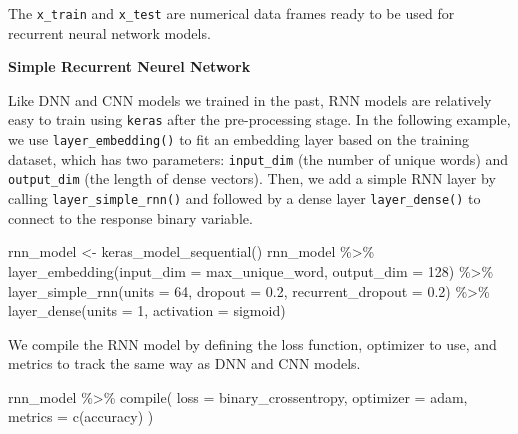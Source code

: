 \documentclass[
  12pt,
]{krantz}
\makeatletter
\newenvironment{Shaded}{\begin{snugshade}}{\end{snugshade}}
\newcommand{\AttributeTok}[1]{\textcolor[rgb]{0.61,0.61,0.61}{#1}}
\newcommand{\DecValTok}[1]{\textcolor[rgb]{0.06,0.06,0.06}{#1}}
\newcommand{\FloatTok}[1]{\textcolor[rgb]{0.06,0.06,0.06}{#1}}
\newcommand{\FunctionTok}[1]{\textcolor[rgb]{0,0,0}{#1}}
\newcommand{\NormalTok}[1]{#1}
\newcommand{\OtherTok}[1]{\textcolor[rgb]{0.37,0.37,0.37}{#1}}
\newcommand{\SpecialCharTok}[1]{\textcolor[rgb]{0,0,0}{#1}}
\newcommand{\StringTok}[1]{\textcolor[rgb]{0.5,0.5,0.5}{#1}}
\newenvironment{kframe}{%
\medskip{}
\setlength{\fboxsep}{.8em}
 \def\at@end@of@kframe{}%
 \ifinner\ifhmode%
  \def\at@end@of@kframe{\end{minipage}}%
  \begin{minipage}{\columnwidth}%
 \fi\fi%
 \def\FrameCommand##1{\hskip\@totalleftmargin \hskip-\fboxsep
 \colorbox{shadecolor}{##1}\hskip-\fboxsep
     \hskip-\linewidth \hskip-\@totalleftmargin \hskip\columnwidth}%
 \MakeFramed {\advance\hsize-\width
   \@totalleftmargin\z@ \linewidth\hsize
   \@setminipage}}%
 {\par\unskip\endMakeFramed%
 \at@end@of@kframe}
\renewenvironment{Shaded}{\begin{kframe}}{\end{kframe}}
\makeatother
\begin{document}
The \texttt{x\_train} and \texttt{x\_test} are numerical data frames ready to be used for recurrent neural network models.

\textbf{Simple Recurrent Neurel Network}

Like DNN and CNN models we trained in the past, RNN models are relatively easy to train using \texttt{keras} after the pre-processing stage. In the following example, we use \texttt{layer\_embedding()} to fit an embedding layer based on the training dataset, which has two parameters: \texttt{input\_dim} (the number of unique words) and \texttt{output\_dim} (the length of dense vectors). Then, we add a simple RNN layer by calling \texttt{layer\_simple\_rnn()} and followed by a dense layer \texttt{layer\_dense()} to connect to the response binary variable.

\begin{Shaded}
\begin{Highlighting}[]
\NormalTok{rnn\_model }\OtherTok{\textless{}{-}} \FunctionTok{keras\_model\_sequential}\NormalTok{()}
\NormalTok{rnn\_model }\SpecialCharTok{\%\textgreater{}\%}
  \FunctionTok{layer\_embedding}\NormalTok{(}\AttributeTok{input\_dim =}\NormalTok{ max\_unique\_word, }\AttributeTok{output\_dim =} \DecValTok{128}\NormalTok{) }\SpecialCharTok{\%\textgreater{}\%} 
  \FunctionTok{layer\_simple\_rnn}\NormalTok{(}\AttributeTok{units =} \DecValTok{64}\NormalTok{, }\AttributeTok{dropout =} \FloatTok{0.2}\NormalTok{, }
                   \AttributeTok{recurrent\_dropout =} \FloatTok{0.2}\NormalTok{) }\SpecialCharTok{\%\textgreater{}\%} 
  \FunctionTok{layer\_dense}\NormalTok{(}\AttributeTok{units =} \DecValTok{1}\NormalTok{, }\AttributeTok{activation =} \StringTok{\textquotesingle{}sigmoid\textquotesingle{}}\NormalTok{)}
\end{Highlighting}
\end{Shaded}

We compile the RNN model by defining the loss function, optimizer to use, and metrics to track the same way as DNN and CNN models.

\begin{Shaded}
\begin{Highlighting}[]
\NormalTok{rnn\_model }\SpecialCharTok{\%\textgreater{}\%} \FunctionTok{compile}\NormalTok{(}
  \AttributeTok{loss =} \StringTok{\textquotesingle{}binary\_crossentropy\textquotesingle{}}\NormalTok{,}
  \AttributeTok{optimizer =} \StringTok{\textquotesingle{}adam\textquotesingle{}}\NormalTok{,}
  \AttributeTok{metrics =} \FunctionTok{c}\NormalTok{(}\StringTok{\textquotesingle{}accuracy\textquotesingle{}}\NormalTok{)}
\NormalTok{)}
\end{Highlighting}
\end{Shaded}
\end{document}
